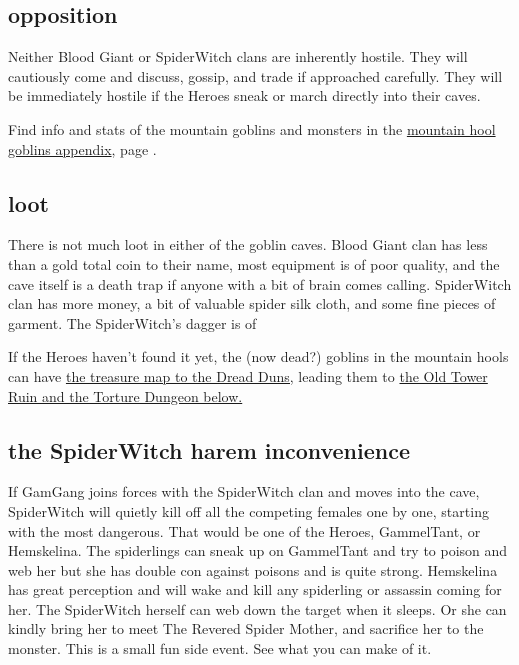 \subsection*{opposition}

Neither Blood Giant or SpiderWitch clans are inherently hostile. They will cautiously come and discuss, gossip, and trade if approached carefully. They will be immediately hostile if the Heroes sneak or march directly into their caves.

Find info and stats of the mountain goblins and monsters in the \hyperref[appendixmountaingoblins]{mountain hool goblins appendix}, page \pageref{appendixmountaingoblins}.


\subsection*{loot}

There is not much loot in either of the goblin caves. Blood Giant clan has less than a gold total coin to their name, most equipment is of poor quality, and the cave itself is a death trap if anyone with a bit of brain comes calling. SpiderWitch clan has more money, a bit of valuable spider silk cloth, and some fine pieces of garment. The SpiderWitch's dagger is of 

If the Heroes haven't found it yet, the (now dead?) goblins in the mountain hools can have 
\hyperref[appendixtreasuremap]{the treasure map to the Dread Duns,} 
leading them to 
\hyperref[xxtorturedungeon]{the Old Tower Ruin and the Torture Dungeon below.} 


\subsection*{the SpiderWitch harem inconvenience}

If GamGang joins forces with the SpiderWitch clan and moves into the cave, SpiderWitch will quietly kill off all the competing females one by one, starting with the most dangerous. That would be one of the Heroes, GammelTant, or Hemskelina. The spiderlings can sneak up on GammelTant and try to poison and web her but she has double con against poisons and is quite strong. Hemskelina has great perception and will wake and kill any spiderling or assassin coming for her. The SpiderWitch herself can web down the target when it sleeps. Or she can kindly bring her to meet The Revered Spider Mother, and sacrifice her to the monster.
This is a small fun side event. See what you can make of it.

















